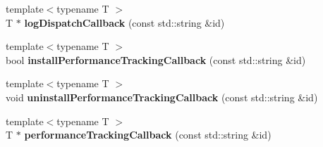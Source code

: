 \begin{DoxyCompactItemize}
\item 
{\footnotesize template$<$typename T $>$ }\\T $\ast$ {\bfseries log\+Dispatch\+Callback} (const std\+::string \&id)\hypertarget{classel_1_1base_1_1Storage_a408d2420169a7f7286552fd153967b8d}{}\label{classel_1_1base_1_1Storage_a408d2420169a7f7286552fd153967b8d}

\item 
{\footnotesize template$<$typename T $>$ }\\bool {\bfseries install\+Performance\+Tracking\+Callback} (const std\+::string \&id)\hypertarget{classel_1_1base_1_1Storage_ad95b77123066f0a49817155dd75583b5}{}\label{classel_1_1base_1_1Storage_ad95b77123066f0a49817155dd75583b5}

\item 
{\footnotesize template$<$typename T $>$ }\\void {\bfseries uninstall\+Performance\+Tracking\+Callback} (const std\+::string \&id)\hypertarget{classel_1_1base_1_1Storage_a0e69baf4bf3140fb7bc88bb386d933cf}{}\label{classel_1_1base_1_1Storage_a0e69baf4bf3140fb7bc88bb386d933cf}

\item 
{\footnotesize template$<$typename T $>$ }\\T $\ast$ {\bfseries performance\+Tracking\+Callback} (const std\+::string \&id)\hypertarget{classel_1_1base_1_1Storage_aa511779589370416030d9fc1149a32fd}{}\label{classel_1_1base_1_1Storage_aa511779589370416030d9fc1149a32fd}

\end{DoxyCompactItemize}
